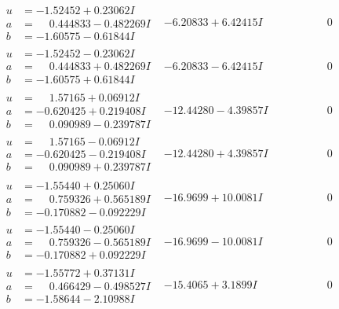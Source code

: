 \documentclass[1p]{elsarticle_modified}
\theoremstyle{definition}
\begin{document}
$$\begin{array}{c|c|c}
\begin{aligned}
u &= -1.52452 + 0.23062 I \\
a &= \phantom{-}0.444833 - 0.482269 I \\
b &= -1.60575 - 0.61844 I\end{aligned}
 & -6.20833 + 6.42415 I & \phantom{-0.000000 } 0 \\ \hline\begin{aligned}
u &= -1.52452 - 0.23062 I \\
a &= \phantom{-}0.444833 + 0.482269 I \\
b &= -1.60575 + 0.61844 I\end{aligned}
 & -6.20833 - 6.42415 I & \phantom{-0.000000 } 0 \\ \hline\begin{aligned}
u &= \phantom{-}1.57165 + 0.06912 I \\
a &= -0.620425 + 0.219408 I \\
b &= \phantom{-}0.090989 - 0.239787 I\end{aligned}
 & -12.44280 - 4.39857 I & \phantom{-0.000000 } 0 \\ \hline\begin{aligned}
u &= \phantom{-}1.57165 - 0.06912 I \\
a &= -0.620425 - 0.219408 I \\
b &= \phantom{-}0.090989 + 0.239787 I\end{aligned}
 & -12.44280 + 4.39857 I & \phantom{-0.000000 } 0 \\ \hline\begin{aligned}
u &= -1.55440 + 0.25060 I \\
a &= \phantom{-}0.759326 + 0.565189 I \\
b &= -0.170882 - 0.092229 I\end{aligned}
 & -16.9699 + 10.0081 I & \phantom{-0.000000 } 0 \\ \hline\begin{aligned}
u &= -1.55440 - 0.25060 I \\
a &= \phantom{-}0.759326 - 0.565189 I \\
b &= -0.170882 + 0.092229 I\end{aligned}
 & -16.9699 - 10.0081 I & \phantom{-0.000000 } 0 \\ \hline\begin{aligned}
u &= -1.55772 + 0.37131 I \\
a &= \phantom{-}0.466429 - 0.498527 I \\
b &= -1.58644 - 2.10988 I\end{aligned}
 & -15.4065 + 3.1899 I & \phantom{-0.000000 } 0 \\ \hline\begin{aligned}

\end{aligned}
\end{array}$$
\end{document}
